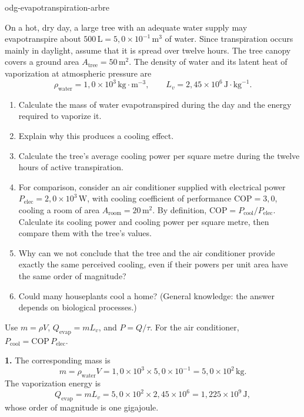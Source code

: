 \begin{exo}{odg-evapotranspiration-arbre}

On a hot, dry day, a large tree with an adequate water supply may evapotranspire about $500\,\text{L}=5{,}0\times10^{-1}\,\text{m}^3$ of water. Since transpiration occurs mainly in daylight, assume that it is spread over twelve hours. The tree canopy covers a ground area $A_{\text{tree}}=50\,\text{m}^2$. The density of water and its latent heat of vaporization at atmospheric pressure are
\[
\rho_{\text{water}}=1{,}0\times10^3\,\text{kg}\!\cdot\!\text{m}^{-3},
\qquad L_v=2{,}45\times10^6\,\text{J}\!\cdot\!\text{kg}^{-1}.
\]

\begin{enumerate}
  \item Calculate the mass of water evapotranspired during the day and the energy required to vaporize it.
  \item Explain why this produces a cooling effect.
  \item Calculate the tree's average cooling power per square metre during the twelve hours of active transpiration.
  \item For comparison, consider an air conditioner supplied with electrical power $P_{\mathrm{elec}}=2{,}0\times10^3\,\text{W}$, with cooling coefficient of performance $\mathrm{COP}=3{,}0$, cooling a room of area $A_{\mathrm{room}}=20\,\text{m}^2$. By definition, $\mathrm{COP}=P_{\mathrm{cool}}/P_{\mathrm{elec}}$. Calculate its cooling power and cooling power per square metre, then compare them with the tree's values.
  \item Why can we not conclude that the tree and the air conditioner provide exactly the same perceived cooling, even if their powers per unit area have the same order of magnitude?
  \item Could many houseplants cool a home? (General knowledge: the answer depends on biological processes.)
\end{enumerate}

\begin{indication}
Use $m=\rho V$, $Q_{\mathrm{evap}}=mL_v$, and $P=Q/\tau$. For the air conditioner, $P_{\mathrm{cool}}=\mathrm{COP}\,P_{\mathrm{elec}}$.
\end{indication}

\begin{solution}
\textbf{1.} The corresponding mass is
\[
m=\rho_{\text{water}}V
=1{,}0\times10^3\times5{,}0\times10^{-1}
=5{,}0\times10^2\,\text{kg}.
\]
The vaporization energy is
\[
Q_{\mathrm{evap}}=mL_v
=5{,}0\times10^2\times2{,}45\times10^6
=1{,}225\times10^9\,\text{J},
\]
whose order of magnitude is one gigajoule.


\end{solution}
\end{exo}
